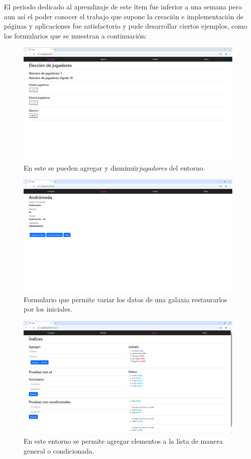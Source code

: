 El periodo dedicado al aprendizaje de este ítem fue inferior a una semana pero aun así el poder conocer el trabajo que supone la creación e implementación de páginas y aplicaciones fue satisfactorio y pude desarrollar ciertos ejemplos, como los formularios que se muestran a continuación:

\begin{figure}[H]
    \centering
    \includegraphics[width=0.8\linewidth]{figuras/pag1.png}
    \caption{En este se pueden agregar y disminuir\textit{jugadores} del entorno.}
    \label{pag1}
\end{figure}
\begin{figure}[H]
     \centering
    \includegraphics[width=0.8\linewidth]{figuras/pag2.png}
    \caption{Formulario que permite variar los datos de una galaxia restaurarlos por los iniciales.}
    \label{pag2}
\end{figure}
\begin{figure}[H]
\centering
    \includegraphics[width=0.8\linewidth]{figuras/pag3.png}
    \caption{En este entorno se permite agregar elementos a la lista de manera general o condicionada.}
    \label{pag3}
\end{figure}
